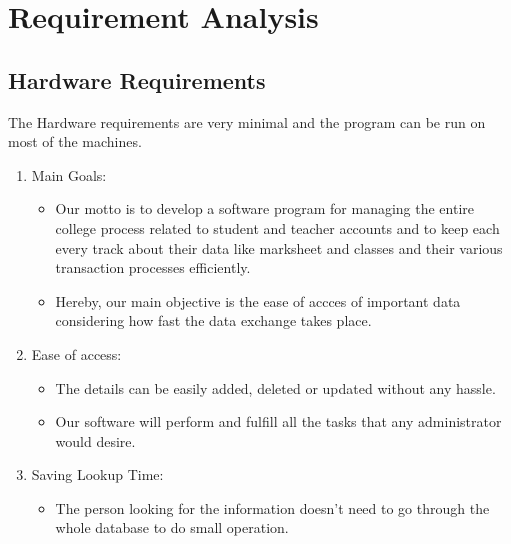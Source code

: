 \chapter{Requirement Analysis}

\section{Hardware Requirements}
\textup{The Hardware requirements are very minimal and the program can be run on most of the machines.}
\begin{enumerate}
	\item Main Goals:
		\begin{itemize}
		\item Our motto is to develop a software program for managing the entire college process related to student and teacher accounts and to keep each every track about their data like marksheet and classes and their various transaction processes efficiently.
		\item Hereby, our main objective is the ease of accces of important data considering how fast the data exchange takes place.
		\end{itemize}
	\item Ease of access:
		\begin{itemize}
		\item The details can be easily added, deleted or updated without any hassle.
		\item Our software will perform and fulfill all the tasks that any administrator would desire.
		\end{itemize}		
	\item Saving Lookup Time:
		\begin{itemize}
		\item The person looking for the information doesn't need to go through the whole database to do small operation.
		\end{itemize}
	\end{enumerate}




